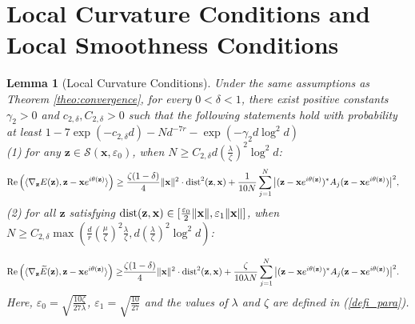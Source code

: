 \documentclass{article}
\renewcommand{\eqref}[1]{(\ref{#1})}
\newcommand{\calS}{{\mathcal S}}
\newcommand{\re}{{\rm Re}}
\newcommand{\dist}{{\rm dist}}
\newcommand{\vx}{{\mathbf x}}
\newcommand{\vz}{{\mathbf z}}
\newcommand{\0}{{\mathbf 0}}
\newtheorem{lemma}[theorem]{Lemma}
\numberwithin{equation}{section}
\begin{document}
	\section{Local Curvature Conditions and Local Smoothness Conditions}\label{sec:local_curvature_smoothness}	
	\begin{lemma}[Local Curvature Conditions]	\label{lem:lem_regularity_cond}
		Under the same assumptions as Theorem \ref{theo:convergence}, for every $0<\delta<1$, there exist positive constants $\gamma_2>0$ and $c_{2,\delta}, C_{2,\delta}>0$ such that the following statements hold with probability at least $1-7\exp(-c_{2,\delta} d)-Nd^{-7r}
		-\exp(-\gamma_2 d\log^2 d)$\\
		(1) for any $ \vz\in\calS(\vx,\varepsilon_0)$, when $N\ge C_{2,\delta} d\left(\frac{\lambda}{\zeta}\right)^2\log^2 d$:
		\begin{equation}\label{curvature_condition0}
			\begin{split}
				&\re\left(\langle\nabla_{\vz} E(\vz),\vz-\vx e^{i\theta(\vz)}\rangle\right)
				\ge \frac{\zeta(1-\delta)}{4}\|\vx\|^2\cdot\dist^2(\vz,\vx)+\frac{1}{10N}\sum_{j=1}^{N}\big|(\vz-\vx e^{i\theta(\vz)})^*A_j(\vz-\vx e^{i\theta(\vz)})\big|^2,
			\end{split}
		\end{equation}
		(2) for all $\vz$ satisfying $\dist(\vz,\vx)\in[\frac{\varepsilon_0}2\|\vx\|,\varepsilon_1\|\vx\|]$, when $N\ge C_{2,\delta}\max\left(\frac dr\left(\frac{\mu}{\zeta}\right)^2\frac{\lambda}{\zeta}, d\left(\frac{\lambda}{\zeta}\right)^2\log^2 d\right)$:  
		
		\begin{equation}\label{eq:curvature_condition0}
			\begin{split}
				\re\left(\langle\nabla_{\vz} \widetilde E(\vz),\vz-\vx e^{i\theta(\vz)}\rangle\right)\ge& \frac{\zeta(1-\delta)}{4}\|\vx\|^2\cdot\dist^2(\vz,\vx)+\frac{\zeta}{10\lambda N}\sum_{j=1}^{N}\big|(\vz-\vx e^{i\theta(\vz)})^*A_j(\vz-\vx e^{i\theta(\vz)})\big|^2.
			\end{split}
		\end{equation}
		Here, $\varepsilon_0 =\sqrt{\frac{10\zeta}{27\lambda}}$, $\varepsilon_1 =\sqrt{\frac{10}{27}}$ and the values of $\lambda$ and $\zeta$ are defined in \eqref{defi_para}.
	\end{lemma}
\end{document}
